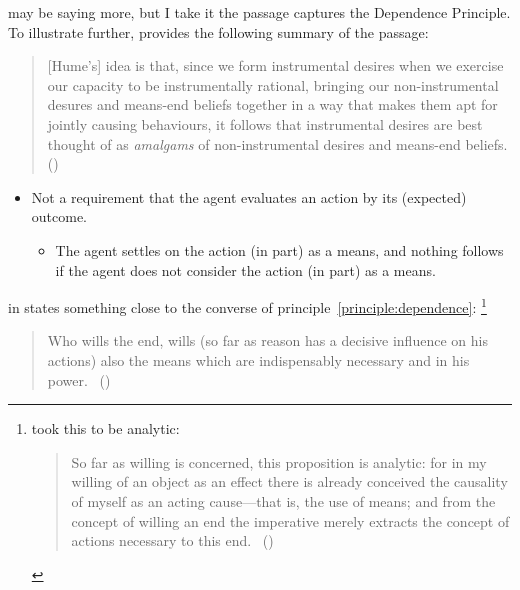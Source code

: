 \documentclass[10pt]{article}
\newcommand{\hand}{\ding{43}}
\newcommand{\hozlinedash}[0]{%
  \noindent\hdashrule[0.5ex][c]{\textwidth}{.1pt}{2.5pt}
}
\newcommand{\dependencePrinciple}[0]{\textsf{Dependence Principle}}
\begin{document}
\citeauthor{Hume:2011aa} may be saying more, but I take it the passage captures the \dependencePrinciple.
To illustrate further, \citeauthor{Smith:2015ab} provides the following summary of the passage:

\begin{quote}
  [Hume's] idea is that, since we form instrumental desires when we exercise our capacity to be instrumentally rational, bringing our non-instrumental desures and means-end beliefs together in a way that makes them apt for jointly causing behaviours, it follows that instrumental desires are best thought of as \emph{amalgams} of non-instrumental desires and means-end beliefs.\nolinebreak
  \mbox{}\hfill\mbox{(\citeyear[35]{Smith:2015ab})}
\end{quote}


\begin{itemize}
\item[\hand] Not a requirement that the agent evaluates an action by its (expected) outcome.
  \begin{itemize}
  \item The agent settles on the action (in part) as a means, and nothing follows if the agent does not consider the action (in part) as a means.
  \end{itemize}
\end{itemize}

\hozlinedash

\citeauthor{Kant:1948aa} in  states something close to the converse of principle~\ref{principle:dependence}:\nolinebreak
\footnote{\citeauthor{Kant:1948aa} took this to be analytic:
  \begin{quote}
    So far as willing is concerned, this proposition is analytic: for in my willing of an object as an effect there is already conceived the causality of myself as an acting cause---that is, the use of means; and from the concept of willing an end the imperative merely extracts the concept of actions necessary to this end.\nolinebreak
    \mbox{ }\hfill(\citeyear[81]{Kant:1948aa})
  \end{quote}
}

\begin{quote}
  Who wills the end, wills (so far as reason has a decisive influence on his actions) also the means which are indispensably necessary and in his power.\nolinebreak
  \mbox{ }\hfill\mbox{(\citeyear[80--81/Ak 417]{Kant:1948aa})}
\end{quote}

\hozlinedash
\end{document}
